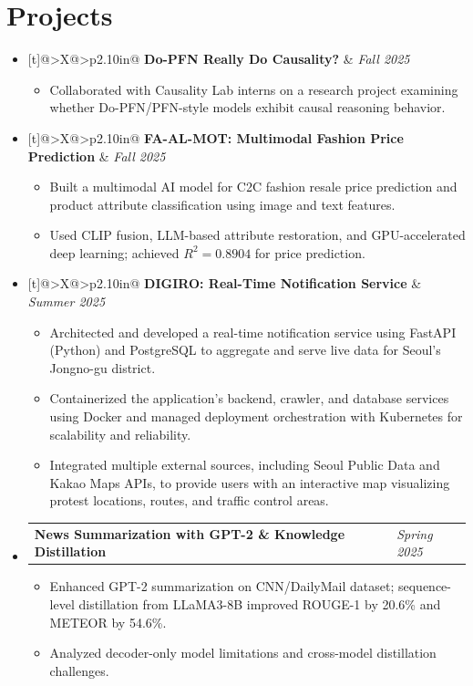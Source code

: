 \documentclass[11pt,a4paper]{article}
\makeatletter
\newcommand{\projectitem}[2]{%
  \item \begin{tabularx}{\linewidth}[t]{@{}>{\RaggedRight\arraybackslash}X@{\hspace{0.8em}}>{\RaggedLeft\arraybackslash}p{2.10in}@{}}
  \textbf{#1} & \textit{#2}
  \end{tabularx}\vspace{-0.14em}
}
\makeatother
\begin{document}
\section*{Projects}
\begin{itemize}[label=$\bullet$, leftmargin=0.70em]

  \projectitem{Do-PFN Really Do Causality?}{Fall 2025}
  \begin{itemize}
    \item Collaborated with Causality Lab interns on a research project examining whether Do-PFN/PFN-style models exhibit causal reasoning behavior.
  \end{itemize}

  \projectitem{FA-AL-MOT: Multimodal Fashion Price Prediction}{Fall 2025}
  \begin{itemize}
    \item Built a multimodal AI model for C2C fashion resale price prediction and product attribute classification using image and text features.
    \item Used CLIP fusion, LLM-based attribute restoration, and GPU-accelerated deep learning; achieved $R^2 = 0.8904$ for price prediction.
  \end{itemize}

  \projectitem{DIGIRO: Real-Time Notification Service}{Summer 2025}
  \begin{itemize}
    \item Architected and developed a real-time notification service using FastAPI (Python) and PostgreSQL to aggregate and serve live data for Seoul's Jongno-gu district.
    \item Containerized the application's backend, crawler, and database services using Docker and managed deployment orchestration with Kubernetes for scalability and reliability.
    \item Integrated multiple external sources, including Seoul Public Data and Kakao Maps APIs, to provide users with an interactive map visualizing protest locations, routes, and traffic control areas.
  \end{itemize}

  \projectitem{News Summarization with GPT-2 \& Knowledge Distillation}{Spring 2025}
  \begin{itemize}
    \item Enhanced GPT-2 summarization on CNN/DailyMail dataset; sequence-level distillation from LLaMA3-8B improved ROUGE-1 by 20.6\% and METEOR by 54.6\%.
    \item Analyzed decoder-only model limitations and cross-model distillation challenges.
  \end{itemize}


\end{itemize}
\end{document}
